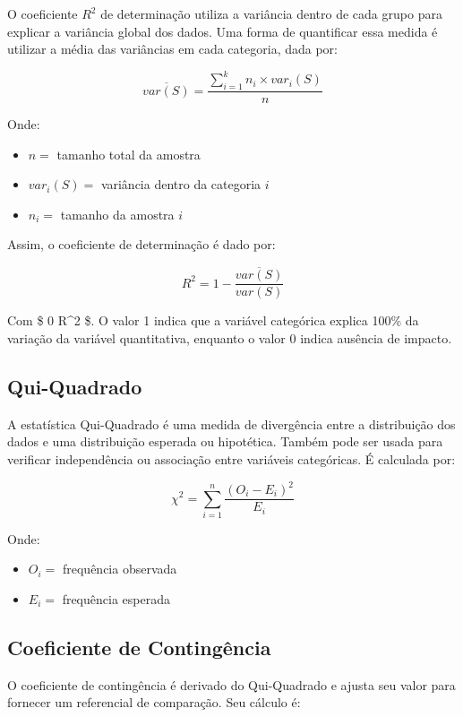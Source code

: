 \documentclass[
  portuguese,
]{estat/estat}
\providecommand{\tightlist}{%
  \setlength{\itemsep}{0pt}\setlength{\parskip}{0pt}}
\begin{document}
O coeficiente \(R^2\) de determinação utiliza a variância dentro de cada
grupo para explicar a variância global dos dados. Uma forma de
quantificar essa medida é utilizar a média das variâncias em cada
categoria, dada por:

\[
\overline{var(S)} = \frac{\displaystyle \sum_{i=1}^{k}n_i \times var_i(S)}{n}
\]

Onde:

\begin{itemize}
\tightlist
\item
  \(n =\) tamanho total da amostra
\item
  \(var_i(S) =\) variância dentro da categoria \(i\)
\item
  \(n_i =\) tamanho da amostra \(i\)
\end{itemize}

Assim, o coeficiente de determinação é dado por:

\[
R^2 = 1 - \frac{\overline{var(S)}}{var(S)}
\]

Com \$ 0 \leq R\^{}2 \$. O valor 1 indica que a variável
categórica explica 100\% da variação da variável quantitativa, enquanto
o valor 0 indica ausência de impacto.

\subsection{Qui-Quadrado}\label{qui-quadrado}

A estatística Qui-Quadrado é uma medida de divergência entre a
distribuição dos dados e uma distribuição esperada ou hipotética. Também
pode ser usada para verificar independência ou associação entre
variáveis categóricas. É calculada por:

\[
\chi^2 = \sum_{i=1}^{n} \frac{(O_i-E_i)^2}{E_i}
\]

Onde:

\begin{itemize}
\tightlist
\item
  \(O_i =\) frequência observada
\item
  \(E_i =\) frequência esperada
\end{itemize}

\subsection{Coeficiente de
Contingência}\label{coeficiente-de-continguxeancia}

O coeficiente de contingência é derivado do Qui-Quadrado e ajusta seu
valor para fornecer um referencial de comparação. Seu cálculo é:
\end{document}

